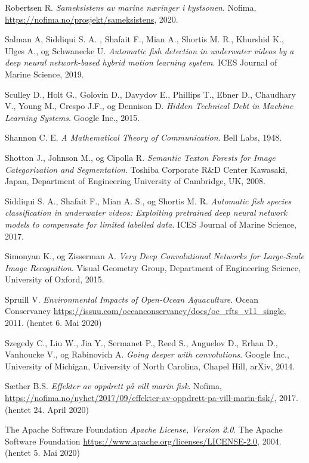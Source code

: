 \documentclass[11ot]{article}
\begin{document}
\begin{thebibliography}{9}
Robertsen R. 
\textit{Sameksistens av marine næringer i kystsonen}. 
Nofima, \url{https://nofima.no/prosjekt/sameksistens}, 2020.

Salman A, Siddiqui S. A. , Shafait F., Mian A., Shortis M. R., Khurshid K., Ulges A., og Schwanecke U. 
\textit{Automatic fish detection in underwater videos by a deep neural network-based hybrid motion learning system}. 
ICES Journal of Marine Science, 2019.

Sculley D., Holt G., Golovin D., Davydov E., Phillips T., Ebner D., Chaudhary V., Young M., Crespo J.F., og Dennison D. 
\textit{Hidden Technical Debt in Machine Learning Systems}. 
Google Inc., 2015.

Shannon C. E. 
\textit{A Mathematical Theory of Communication}. 
Bell Labs, 1948.

Shotton J., Johnson M., og Cipolla R. 
\textit{Semantic Texton Forests for Image Categorization and Segmentation}. 
Toshiba Corporate R\&D Center Kawasaki, Japan, Department of Engineering University of Cambridge, UK, 2008.

Siddiqui S. A., Shafait F., Mian A. S., og Shortis M. R. 
\textit{Automatic fish species classification in underwater videos: Exploiting pretrained deep neural network models to compensate for limited labelled data}. 
ICES Journal of Marine Science, 2017.

Simonyan K., og Zisserman A. 
\textit{Very Deep Convolutional Networks for Large-Scale Image Recognition}. 
Visual Geometry Group, Department of Engineering Science, University of Oxford, 2015.

Spruill V.
\textit{Environmental Impacts of Open-Ocean Aquaculture}. 
Ocean Conservancy \url{https://issuu.com/oceanconservancy/docs/oc_rfts_v11_single}, 2011. (hentet 6. Mai 2020)

Szegedy C., Liu W., Jia Y., Sermanet P., Reed S., Anguelov D., Erhan D., Vanhoucke V., og Rabinovich A. 
\textit{Going deeper with convolutions}. 
Google Inc., University of Michigan, University of North Carolina, Chapel Hill, arXiv, 2014.

Sæther B.S. 
\textit{Effekter av oppdrett på vill marin fisk}. 
Nofima, \url{https://nofima.no/nyhet/2017/09/effekter-av-oppdrett-pa-vill-marin-fisk/}, 2017. (hentet 24. April 2020)

The Apache Software Foundation 
\textit{Apache License, Version 2.0}. 
The Apache Software Foundation \url{https://www.apache.org/licenses/LICENSE-2.0}, 2004. (hentet 5. Mai 2020)


\end{thebibliography}
\end{document}
